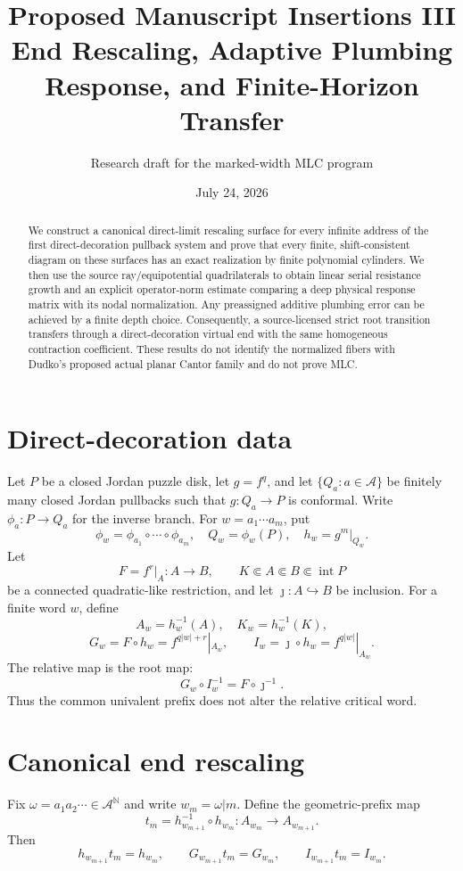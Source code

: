\documentclass[11pt]{article}
\title{Proposed Manuscript Insertions III\\
End Rescaling, Adaptive Plumbing Response, and Finite-Horizon Transfer}
\author{Research draft for the marked-width MLC program}
\date{July 24, 2026}
\theoremstyle{definition}
\theoremstyle{remark}
\begin{document}
\maketitle

\begin{abstract}
We construct a canonical direct-limit rescaling surface for every infinite
address of the first direct-decoration pullback system and prove that every
finite, shift-consistent diagram on these surfaces has an exact realization by
finite polynomial cylinders.  We then use the source ray/equipotential
quadrilaterals to obtain linear serial resistance growth and an explicit
operator-norm estimate comparing a deep physical response matrix with its
nodal normalization.  Any preassigned additive plumbing error can be achieved
by a finite depth choice.  Consequently, a source-licensed strict root
transition transfers through a direct-decoration virtual end with the same
homogeneous contraction coefficient.  These results do not identify the
normalized fibers with Dudko's proposed actual planar Cantor family and do not
prove MLC.
\end{abstract}

\section{Direct-decoration data}
Let $P$ be a closed Jordan puzzle disk, let $g=f^q$, and let
$\{Q_a:a\in\mathcal A\}$ be finitely many closed Jordan pullbacks such that
$g:Q_a\to P$ is conformal.  Write $\phi_a:P\to Q_a$ for the inverse branch.
For $w=a_1\cdots a_m$, put
\[
 \phi_w=\phi_{a_1}\circ\cdots\circ\phi_{a_m},\quad
 Q_w=\phi_w(P),\quad h_w=g^m|_{Q_w}.
\]
Let
\[
 F=f^r|_A:A\to B,\qquad K\Subset A\Subset B\Subset\operatorname{int}P
\]
be a connected quadratic-like restriction, and let $\jmath:A\hookrightarrow B$
be inclusion.  For a finite word $w$, define
\[
 A_w=h_w^{-1}(A),\quad K_w=h_w^{-1}(K),
\]
\[
 G_w=F\circ h_w=f^{q|w|+r}|_{A_w},\qquad
 I_w=\jmath\circ h_w=f^{q|w|}|_{A_w}.
\]
The relative map is the root map:
\[
 G_w\circ I_w^{-1}=F\circ\jmath^{-1}.
\]
Thus the common univalent prefix does not alter the relative critical word.

\section{Canonical end rescaling}
Fix $\omega=a_1a_2\cdots\in\mathcal A^{\mathbb N}$ and write
$w_m=\omega|m$.  Define the geometric-prefix map
\[
 t_m=h_{w_{m+1}}^{-1}\circ h_{w_m}:A_{w_m}\to A_{w_{m+1}}.
\]
Then
\[
 h_{w_{m+1}}t_m=h_{w_m},\qquad
 G_{w_{m+1}}t_m=G_{w_m},\qquad
 I_{w_{m+1}}t_m=I_{w_m}.
\]
\end{document}
